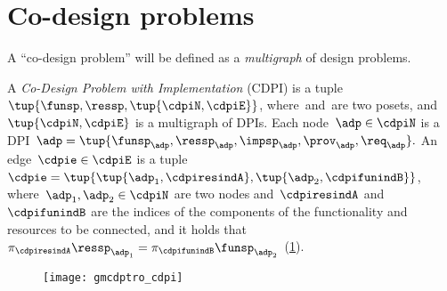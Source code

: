

\section{Co-design problems}
\label{sec:Co-design-problems}


A ``co-design problem'' will be defined as a \emph{multigraph} of design
problems.
\begin{definition}
    \label{def:cdpi}
    A \emph{Co-Design Problem with Implementation} (CDPI)
    is a tuple~$\tup{\funsp,\ressp,\tup{\cdpiN,\cdpiE}}$,
    where~\funsp and~\ressp are two posets, and~$\tup{ \cdpiN,\cdpiE} $
    is a multigraph of DPIs.
    Each node~$\adp\in\cdpiN$ is a
    DPI~$\adp=\tup{\funsp_{\adp},\ressp_{\adp},\impsp_{\adp},\prov_{\adp},\req_{\adp}}.$
    An edge~$\cdpie\in\cdpiE$ is a tuple $\cdpie=\tup{ \tup{ \adp_1,\cdpiresindA} ,\tup{\adp_2,\cdpifunindB}}$,
    where~$\adp_1,\adp_2\in\cdpiN$ are two nodes and~$\cdpiresindA$
    and~$\cdpifunindB$ are the indices of the components of the functionality
    and resources to be connected, and it holds that~$\pi_{\cdpiresindA}\ressp_{\adp_1}=\pi_{\cdpifunindB}\funsp_{\adp_2}$~(\cref{fig:mcdps}).

    \begin{figure}[h]
        \centering
        \texttt{[image: gmcdptro\_cdpi]}
        \caption{\label{fig:mcdps}}
    \end{figure}

\end{definition}

